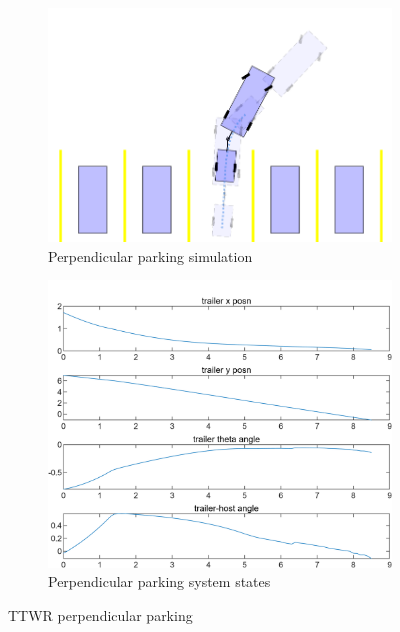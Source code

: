 \begin{figure}
     \centering
     \begin{subfigure}[b]{0.4\textwidth}
         \centering
         \includegraphics[width=\textwidth]{fig/ppo/parkingIllustration.png}
         \caption{Perpendicular parking simulation}
         \label{fig:parking_trajectory_1}
     \end{subfigure}
     \hfill
     \begin{subfigure}[b]{0.4\textwidth}
         \centering
         \includegraphics[width=\textwidth]{fig/ppo/parking_system_states.png}
         \caption{Perpendicular parking system states}
         \label{fig:parking_system_states}
     \end{subfigure}
        \caption{TTWR perpendicular parking}
        \label{fig:perpendicular parking}
\end{figure}

